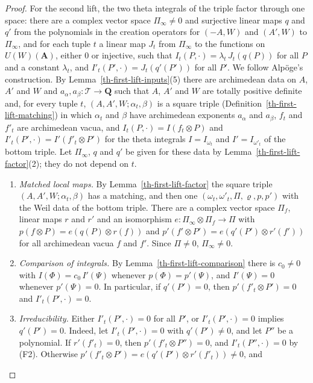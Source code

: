 \begin{proof}
For the second lift, the two theta integrals of the triple factor through one
space: there are a complex vector space $\Pi_\infty\neq0$ and surjective linear
maps $q$ and $q'$ from the polynomials in the creation operators for $(-A,W)$
and $(A',W)$ to $\Pi_\infty$, and for each tuple $t$ a linear map $J_t$ from
$\Pi_\infty$ to the functions on $U(W)(\mathbf A)$, either $0$ or injective,
such that $I_t(P,\cdot)=\lambda_t\,J_t(q(P))$ for all $P$ and a constant
$\lambda_t$, and $I'_t(P',\cdot)=J_t(q'(P'))$ for all $P'$. We follow Alpöge's
construction. By Lemma~\ref{th-first-lift-inputs}(5) there are archimedean
data on $A$, $A'$ and $W$ and $a_\alpha,a_\beta\colon\mathcal T\to\mathbf Q$
such that $A$, $A'$ and $W$ are totally positive definite and, for every tuple
$t$, $(A,A',W;\alpha_t,\beta)$ is a square triple
(Definition~\ref{th-first-lift-matching}) in which $\alpha_t$ and $\beta$ have
archimedean exponents $a_\alpha$ and $a_\beta$, $f_t$ and $f'_t$ are
archimedean vacua, and $I_t(P,\cdot)=I(f_t\otimes P)$ and
$I'_t(P',\cdot)=I'(f'_t\otimes P')$ for the theta integrals $I=I_{\omega_t}$
and $I'=I_{\omega'_t}$ of the bottom triple. Let $\Pi_\infty$, $q$ and $q'$ be
given for these data by Lemma~\ref{th-first-lift-factor}(2); they do not
depend on $t$.
\begin{enumerate}
\item[(F1)] \emph{Matched local maps.} By Lemma~\ref{th-first-lift-factor} the
  square triple $(A,A',W;\alpha_t,\beta)$ has a matching, and then one
  $(\omega_t,\omega'_t,\Pi,\varrho,p,p')$ with the Weil data of the bottom
  triple. There are a complex vector space $\Pi_f$, linear maps $r$ and $r'$
  and an isomorphism $e\colon\Pi_\infty\otimes\Pi_f\to\Pi$ with
  $p(f\otimes P)=e(q(P)\otimes r(f))$ and
  $p'(f'\otimes P')=e(q'(P')\otimes r'(f'))$ for all archimedean vacua $f$ and
  $f'$. Since $\Pi\neq0$, $\Pi_\infty\neq0$.
\item[(F2)] \emph{Comparison of integrals.} By
  Lemma~\ref{th-first-lift-comparison} there is $c_0\neq0$ with
  $I(\Phi)=c_0\,I'(\Psi)$ whenever $p(\Phi)=p'(\Psi)$, and $I'(\Psi)=0$
  whenever $p'(\Psi)=0$. In particular, if $q'(P')=0$, then
  $p'(f'_t\otimes P')=0$ and $I'_t(P',\cdot)=0$.
\item[(F3)] \emph{Irreducibility.} Either $I'_t(P',\cdot)=0$ for all $P'$, or
  $I'_t(P',\cdot)=0$ implies $q'(P')=0$. Indeed, let $I'_t(P',\cdot)=0$ with
  $q'(P')\neq0$, and let $P''$ be a polynomial. If $r'(f'_t)=0$, then
  $p'(f'_t\otimes P'')=0$, and $I'_t(P'',\cdot)=0$ by (F2). Otherwise
  $p'(f'_t\otimes P')=e(q'(P')\otimes r'(f'_t))\neq0$, and

\end{enumerate}
\end{proof}
